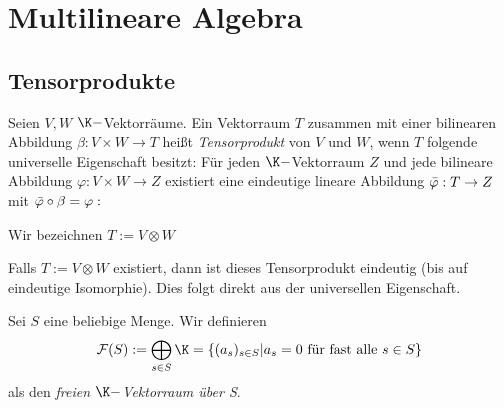 \documentclass[11pt, a4paper]{article}
\begin{document}
\tableofcontents

\newpage


\section{Multilineare Algebra}
\subsection{Tensorprodukte}

\begin{definition} 
    Seien $V,W$ $\K-$Vektorräume. Ein Vektorraum $T$ zusammen mit einer
bilinearen Abbildung $\beta: V \times W \to T$ heißt \emph{Tensorprodukt} von $V$ und $W$, wenn $T$ folgende
universelle Eigenschaft besitzt: Für jeden $\K-$Vektorraum $Z$ und jede bilineare Abbildung $\varphi: V\times W \to Z$ existiert eine eindeutige lineare Abbildung $\Bar{\varphi}: T\to Z$ mit $\Bar{\varphi}\circ \beta = \varphi:$


\begin{figure}[h]
    \centering
{}
\end{figure}

Wir bezeichnen $T:= V\otimes W$
\end{definition}

\begin{lemma} Falls $T:=V\otimes W$ existiert, dann ist dieses Tensorprodukt eindeutig (bis auf eindeutige Isomorphie). Dies folgt direkt aus der universellen Eigenschaft.
\end{lemma}

\begin{definition}
    Sei $S$ eine beliebige Menge. Wir definieren
    $$\mathcal F (S) := \bigoplus_{s\in S} \K = \{(a_s)_{s\in S} |a_s = 0 \text{ für fast alle $s\in S$}\}$$
    als den \emph{freien $\K-$Vektorraum über S}.
\end{definition}
\end{document}
